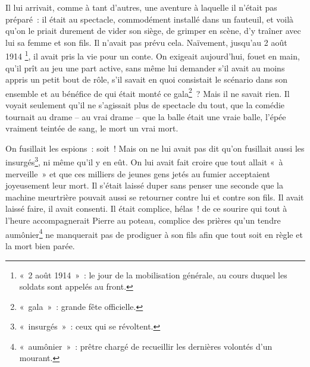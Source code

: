 {Il lui arrivait, comme à tant d'autres, une aventure à laquelle il
n'était pas préparé~: il était au spectacle, commodément installé
dans un fauteuil, et voilà qu'on le priait durement de vider son
siège, de grimper en scène, d'y traîner avec lui sa femme et son
fils. Il n'avait pas prévu cela. Naïvement, jusqu'au 2 août 1914
\footnote{«~2 août 1914~»~: le jour de la mobilisation générale, au
cours duquel les soldats sont appelés au front.}, il avait pris la
vie pour un conte. On exigeait aujourd'hui, fouet en main, qu'il prît
au jeu une part active, sans même lui demander s'il avait au moins
appris un petit bout de rôle, s'il savait en quoi consistait le
scénario dans son ensemble et au bénéfice de qui était monté ce
gala\footnote{«~gala~»~: grande fête officielle.}~? Mais il ne savait
rien. Il voyait seulement qu'il ne s'agissait plus de spectacle du
tout, que la comédie tournait au drame – au vrai drame – que la balle
était une vraie balle, l'épée vraiment teintée de sang, le mort un
vrai mort.

On fusillait les espions~: soit~! Mais on ne lui avait pas dit qu'on
fusillait aussi les insurgés\footnote{«~insurgés~»~: ceux qui se
révoltent.}, ni même qu'il y en eût. On lui avait fait croire que
tout allait «~à merveille~» et que ces milliers de jeunes gens jetés
au fumier acceptaient joyeusement leur mort. Il s'était laissé duper
sans penser une seconde que la machine meurtrière pouvait aussi se
retourner contre lui et contre son fils. Il avait laissé faire, il
avait consenti. Il était complice, hélas~! de ce sourire qui tout à
l'heure accompagnerait Pierre au poteau, complice des prières qu'un
tendre aumônier\footnote{«~aumônier~»~: prêtre chargé de recueillir
les dernières volontés d'un mourant.} ne manquerait pas de prodiguer
à son fils afin que tout soit en règle et la mort bien parée.
}


